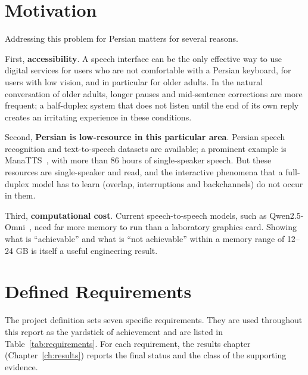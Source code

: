 \section{Motivation}
\label{sec:motivation}

Addressing this problem for Persian matters for several reasons.

First, \textbf{accessibility}. A speech interface can be the only effective way to
use digital services for users who are not comfortable with a Persian keyboard,
for users with low vision, and in particular for older adults. In the natural
conversation of older adults, longer pauses and mid-sentence corrections are more
frequent; a half-duplex system that does not listen until the end of its own
reply creates an irritating experience in these conditions.

Second, \textbf{Persian is low-resource in this particular area}. Persian speech
recognition and text-to-speech datasets are available; a prominent example is
ManaTTS~\cite{qharabagh2025manatts}, with more than 86 hours of single-speaker
speech. But these resources are single-speaker and read, and the interactive
phenomena that a full-duplex model has to learn (overlap, interruptions and
backchannels) do not occur in them.

Third, \textbf{computational cost}. Current speech-to-speech models, such as
Qwen2.5-Omni~\cite{xu2025qwen25omni}, need far more memory to run than a
laboratory graphics card. Showing what is ``achievable'' and what is ``not
achievable'' within a memory range of 12--24 GB is itself a useful engineering
result.

\section{Defined Requirements}
\label{sec:requirements}

The project definition sets seven specific requirements. They are used throughout
this report as the yardstick of achievement and are listed in
Table~\ref{tab:requirements}. For each requirement, the results chapter
(Chapter~\ref{ch:results}) reports the final status and the class of the
supporting evidence.

